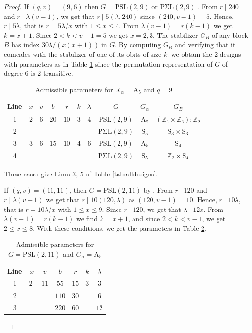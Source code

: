 \documentclass[a4paper,twopage,reqno,12pt]{amsart}
\theoremstyle{definition}
\numberwithin{equation}{section}
\newcommand{\PSL}{\mathrm{PSL}}
\newcommand{\PSigL}{\mathrm{P\Sigma L}}
\newcommand{\A}{\mathrm{A}}
\renewcommand{\S}{\mathrm{S}}
\begin{document}
\begin{proof}
If $(q,v)=(9, 6)$ then $G=\PSL(2,9)$ or $\PSigL(2,9)$ \cite{At}. From $r\mid240$ and $r\mid\lambda(v-1)$, we get that $r\mid 5(\lambda,240)$ since $(240,v-1)=5$. Hence, $r\mid 5\lambda$, that is $r=5\lambda/x$ with $1\le x\le 4$. From $\lambda(v-1)=r(k-1)$ we get $k=x+1$. Since $2<k<v-1=5$ we get $x=2,3$. The stabilizer $G_B$ of any block $B$ has index $30\lambda/(x(x+1))$ in $G$. By computing $G_B$ and verifying that it coincides with the stabilizer of one of its obits of size $k$, we obtain the $2$-designs with parameters as in Table \ref{tab:lem3.7_q9} since the permutation representation of $G$ of degree $6$ is $2$-transitive. 
\begin{table}[H]
\tiny
\centering
 \caption{Admissible parameters for $X_\alpha=\A_5$ and $q=9$}
    \label{tab:lem3.7_q9}
    \centering
    \begin{tabular}{cccccccccc}
    \toprule
         Line & $x$ & $v$ & $b$   & $r$   & $k$ & $\lambda$  & $G$ & $G_{\alpha}$ & $G_B$ \\
     \midrule    
         1 & $2$ & $6$ & $20$ & $10$ & $3$ & $4$ & $\PSL(2,9)$ &  $\A_5$ & $(\mathbb{Z}_3 \times \mathbb{Z}_3) \colon \mathbb{Z}_2$ \\
         2 &     &     &      &      &     &     & $\PSigL(2,9)$ & $\S_5$ & $\S_3\times\S_3$ \\
         3 & $3$ & $6$ & $15$ & $10$ & $4$ & $6$  & $\PSL(2,9)$ &  $\A_5$ & $\S_4$ \\
         4 &     &     &      &      &     &     & $\PSigL(2,9)$ & $\S_5$ & $\mathbb{Z}_2\times \S_4$\\
         \bottomrule
    \end{tabular}
\end{table}
These cases give Lines 3, 5 of Table \ref{tab:alldesigns}.

If $(q,v)=(11,11)$, then $G=\PSL(2,11)$ by \cite{At}. From $r\mid 120$ and $r\mid \lambda(v-1)$ we get that $r\mid 10(120,\lambda)$ as $(120,v-1)=10$. Hence, $r\mid 10\lambda$, that is $r=10\lambda/x$ with $1\le x \le 9$. Since $r\mid 120$, we get that $\lambda\mid 12x$. From $\lambda(v-1)=r(k-1)$ we find $k=x+1$, and since $2<k<v-1$, we get $2\le x \le 8$. With these conditions, we get the parameters in Table \ref{tab:lem3.7_q11}.
\begin{table}[H]
\tiny
\centering
    \caption{\small Admissible parameters for $G=\PSL(2,11)$ and $G_\alpha=\A_5$}
    \label{tab:lem3.7_q11}
    \centering
    \begin{tabular}{ccccccc}
    \toprule
         Line& $x$ & $v$  & $b$   & $r$  & $k$  & $\lambda$ \\
         \midrule
        1 & $2$ $ $&$11$ & $55$  & $15$ & $3$  & $3$  \\
        2& &  & $110$ & $30$ &  & $6$          \\
        3& &   & $220$ & $60$ &   & $12$         \\


\end{tabular}
\end{table}
\end{proof}
\end{document}
